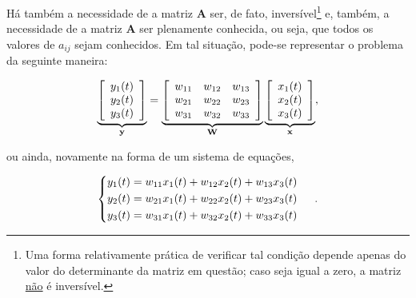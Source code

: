 Há também a necessidade de a matriz $\mathbf{A}$ ser, de fato, inversível\footnote{Uma forma relativamente prática de verificar tal condição depende apenas do valor do determinante da matriz em questão; caso seja igual a zero, a matriz \underline{não} é inversível.} e, também, a necessidade de a matriz $\mathbf{A}$ ser plenamente conhecida, ou seja, que todos os valores de $a_{ij}$ sejam conhecidos. Em tal situação, pode-se representar o problema da seguinte maneira:

\begin{equation}
    \underbrace{
    \left[\begin{array}{c}
        y_{1}(t) \\
        y_{2}(t) \\
        y_{3}(t)
    \end{array}\right]}_{\mathbf{y}}
    =
    \underbrace{
    \left[\begin{array}{ccc}
        w_{11} & w_{12} & w_{13} \\
        w_{21} & w_{22} & w_{23} \\
        w_{31} & w_{32} & w_{33}
    \end{array}\right]}_{\mathbf{W}}
    \underbrace{
    \left[\begin{array}{c}
        x_{1}(t) \\
        x_{2}(t) \\
        x_{3}(t)
    \end{array}\right]}_{\mathbf{x}},
    \vspace{0.2cm}
    \label{eq:bss_inv_weighted_sum_mat}
\end{equation}

\noindent ou ainda, novamente na forma de um sistema de equações,

\begin{equation}
\begin{cases}
\begin{aligned}
    y_{1}(t) = w_{11} x_{1}(t) +  w_{12} x_{2}(t) +  w_{13} x_{3}(t) \\
    y_{2}(t) = w_{21} x_{1}(t) +  w_{22} x_{2}(t) +  w_{23} x_{3}(t) \\
    y_{3}(t) = w_{31} x_{1}(t) +  w_{32} x_{2}(t) +  w_{33} x_{3}(t)
    \label{eq:bss_inv_weighted_sum}
\end{aligned}
\end{cases}
\hspace{0.1cm}.
\vspace{0.2cm}
\end{equation}

